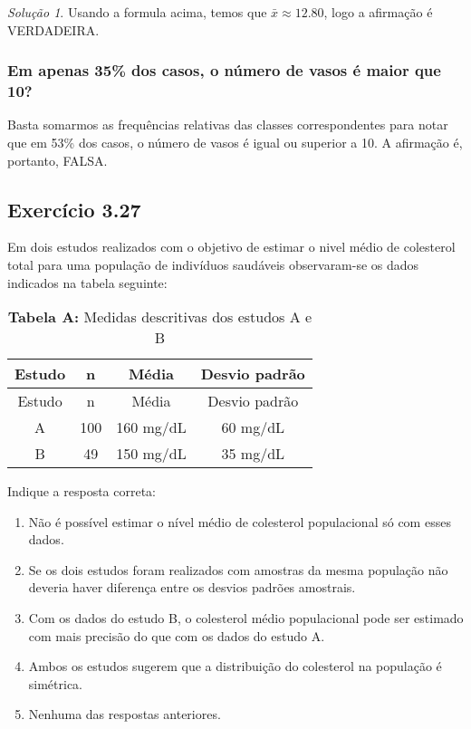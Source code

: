\documentclass[
]{latex/krantz}
\providecommand{\tightlist}{%
  \setlength{\itemsep}{0pt}\setlength{\parskip}{0pt}}
\theoremstyle{definition}
\theoremstyle{definition}
\theoremstyle{definition}
\theoremstyle{definition}
\theoremstyle{remark}
\newtheorem*{solution}{Solução}
\begin{document}
\begin{solution}
Usando a formula acima, temos que \(\bar{x} \approx 12.80\), logo a afirmação é VERDADEIRA.

\hypertarget{em-apenas-35-dos-casos-o-nuxfamero-de-vasos-uxe9-maior-que-10}{%
\subsubsection*{Em apenas 35\% dos casos, o número de vasos é maior que 10?}\label{em-apenas-35-dos-casos-o-nuxfamero-de-vasos-uxe9-maior-que-10}}

Basta somarmos as frequências relativas das classes correspondentes para notar que em 53\% dos casos, o número de vasos é igual ou superior a 10. A afirmação é, portanto, FALSA.

\end{solution}

\hypertarget{exr3-27}{%
\subsection*{Exercício 3.27}\label{exr3-27}}

Em dois estudos realizados com o objetivo de estimar o nivel médio de colesterol total para uma população de indivíduos saudáveis observaram-se os dados indicados na tabela seguinte:

\begin{longtable}[]{@{}cccc@{}}
\caption{\textbf{Tabela A:} Medidas descritivas dos estudos A e B}\tabularnewline
\toprule\noalign{}
Estudo & n & Média & Desvio padrão \\
\midrule\noalign{}
\endfirsthead
\toprule\noalign{}
Estudo & n & Média & Desvio padrão \\
\midrule\noalign{}
\endhead
\bottomrule\noalign{}
\endlastfoot
A & 100 & 160 mg/dL & 60 mg/dL \\
B & 49 & 150 mg/dL & 35 mg/dL \\
\end{longtable}

Indique a resposta correta:

\begin{enumerate}
\def\labelenumi{\alph{enumi})}
\tightlist
\item
  Não é possível estimar o nível médio de colesterol populacional só com esses dados.
\item
  Se os dois estudos foram realizados com amostras da mesma população não deveria haver diferença entre os desvios padrões amostrais.
\item
  Com os dados do estudo B, o colesterol médio populacional pode ser estimado com mais precisão do que com os dados do estudo A.
\item
  Ambos os estudos sugerem que a distribuição do colesterol na população é simétrica.
\item
  Nenhuma das respostas anteriores.
\end{enumerate}
\end{document}
